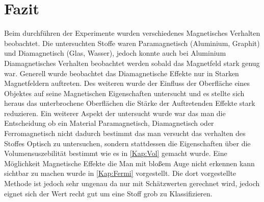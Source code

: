 \section{Fazit}
Beim durchführen der Experimente wurden verschiedenes Magnetisches Verhalten beobachtet.
Die untersuchten Stoffe waren Paramagnetisch (Aluminium, Graphit) und Diamagnetisch (Glas, Wasser),
jedoch konnte auch bei Aluminium Diamagnetisches Verhalten beobachtet werden sobald das Magnetfeld stark genug war.
Generell wurde beobachtet das Diamagnetische Effekte nur in Starken Magnetfeldern auftreten. Des weiteren wurde der Einfluss der 
Oberfläche eines Objektes auf seine Magnetischen Eigenschaften untersucht und es stellte sich heraus das unterbrochene Oberflächen die Stärke der Auftretenden Effekte stark reduzieren.
Ein weiterer Aspekt der untersucht wurde war das man die Entscheidung ob ein Material Paramagnetisch, Diamagnetisch oder Ferromagnetisch nicht dadurch bestimmt das man versucht das verhalten des Stoffes Optisch zu untersuchen,
sondern stattdessen die Eigenschaften über die Volumensuszebilität bestimmt wie es in \cref{Kap:Vol} gemacht wurde.
Eine Möglichkeit Magnetische Effekte die Man mit bloßem Auge nicht erkennen kann sichtbar zu machen wurde in \cref{Kap:Fermi} vorgestellt. Die dort vorgestellte Methode ist jedoch sehr ungenau da nur mit Schätzwerten gerechnet wird,
jedoch eignet sich der Wert recht gut um eine Stoff grob zu Klassifizieren.